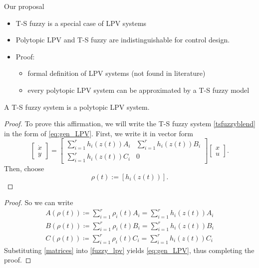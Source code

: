 \begin{frame}{Our proposal}
\begin{itemize}
        \item T-S fuzzy is a special case of LPV systems
        \item Polytopic LPV and T-S fuzzy are indistinguishable for control design. 
        \item Proof: 
        \begin{itemize}
            \item formal definition of LPV systems (not found in literature)
            \item every polytopic LPV system can be approximated by a T-S fuzzy model
        \end{itemize}
        
    \end{itemize}
\end{frame}
\begin{frame}{}
    \begin{theorem}
A T-S fuzzy system is a polytopic LPV system.
\end{theorem}
\begin{proof} \renewcommand{\qedsymbol}{}
To prove this affirmation, we will write the T-S fuzzy system \eqref{tsfuzzyblend} in the form of \eqref{eq:gen_LPV}. First, we write it in vector form
\begin{equation} \label{fuzzy_lpv}
 \begin{bmatrix}
    \dot{x}\\
    y
 \end{bmatrix} = \begin{bmatrix} 
\displaystyle    \sum_{i=1}^{r}h_i(z(t))A_i & \displaystyle \sum_{i=1}^{r}h_i(z(t))B_i\\
\displaystyle    \sum_{i=1}^{r}h_i(z(t))C_i & 0
 \end{bmatrix}\begin{bmatrix}
 x\\
 u
 \end{bmatrix}.
\end{equation}
Then, choose
\begin{equation}
    \rho(t) :=  \left [ h_i(z(t))\right ].
\end{equation}
\end{proof}
\end{frame}

\begin{frame}{}
    \begin{proof}
So we can write
\begin{eqnarray} \label{matrices}
A(\rho(t)) \coloneqq \sum_{i=1}^{r}\rho_i(t)A_i =  \sum_{i=1}^{r}h_i(z(t))A_i\\
B(\rho(t)) \coloneqq \sum_{i=1}^{r}\rho_i(t)B_i =  \sum_{i=1}^{r}h_i(z(t))B_i\\
C(\rho(t)) \coloneqq \sum_{i=1}^{r}\rho_i(t)C_i =  \sum_{i=1}^{r}h_i(z(t))C_i
\end{eqnarray}
Substituting \eqref{matrices} into \eqref{fuzzy_lpv} yields \eqref{eq:gen_LPV}, thus completing the proof. 
\end{proof}
\end{frame}

